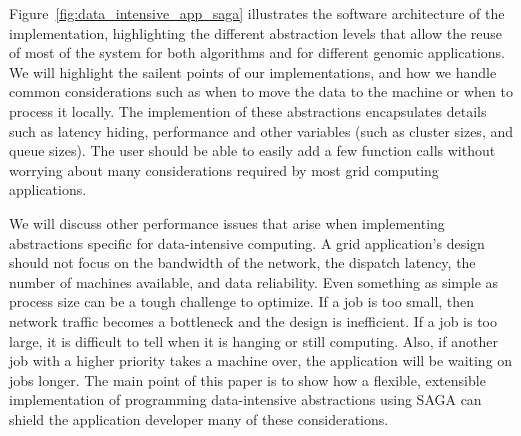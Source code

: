 \documentclass[a4paper,11pt]{article} \usepackage[utf8]{inputenc}
\begin{document}
Figure~\ref{fig:data_intensive_app_saga} illustrates the software
architecture of the implementation, highlighting the different
abstraction levels that allow the reuse of most of the system for both
algorithms and for different genomic applications.  We will highlight
the sailent points of our implementations, and how we handle common
considerations such as when to move the data to the machine or when to
process it locally.  The implemention of these abstractions encapsulates
details such as latency hiding, performance and other variables (such as
cluster sizes, and queue sizes).  The user should be able to easily add
a few function calls without worrying about many considerations required
by most grid computing applications.

We will discuss other performance issues that arise when implementing
abstractions specific for data-intensive computing.  A grid
application's design should not focus on the bandwidth of the network,
the dispatch latency, the number of machines available, and data
reliability.  Even something as simple as process size can be a tough
challenge to optimize.  If a job is too small, then network traffic
becomes a bottleneck and the design is inefficient.  If a job is too
large, it is difficult to tell when it is hanging or still computing.
Also, if another job with a higher priority takes a machine over, the
application will be waiting on jobs longer.  The main point of this
paper is to show how a flexible, extensible implementation of
programming data-intensive abstractions using SAGA can shield the
application developer many of these considerations.




 

\end{document}

